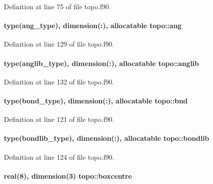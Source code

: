 Definition at line 75 of file topo.\-f90.

\hypertarget{classtopo_a56261b466e299c202f2e574284fbe9c4}{
\paragraph[{ang}]{\setlength{\rightskip}{0pt plus 5cm}type({\bf ang\-\_\-type}), dimension(\-:), allocatable topo\-::ang}}\label{classtopo_a56261b466e299c202f2e574284fbe9c4}


Definition at line 129 of file topo.\-f90.

\hypertarget{classtopo_a4eca44c180379aa76933b665a911feec}{
\paragraph[{anglib}]{\setlength{\rightskip}{0pt plus 5cm}type({\bf anglib\-\_\-type}), dimension(\-:), allocatable topo\-::anglib}}\label{classtopo_a4eca44c180379aa76933b665a911feec}


Definition at line 132 of file topo.\-f90.

\hypertarget{classtopo_ae81427ee7513e74fcb1520cdc0523e56}{
\paragraph[{bnd}]{\setlength{\rightskip}{0pt plus 5cm}type({\bf bond\-\_\-type}), dimension(\-:), allocatable topo\-::bnd}}\label{classtopo_ae81427ee7513e74fcb1520cdc0523e56}


Definition at line 121 of file topo.\-f90.

\hypertarget{classtopo_af8d6aa1609b783f42bbac18b0cf8ae54}{
\paragraph[{bondlib}]{\setlength{\rightskip}{0pt plus 5cm}type({\bf bondlib\-\_\-type}), dimension(\-:), allocatable topo\-::bondlib}}\label{classtopo_af8d6aa1609b783f42bbac18b0cf8ae54}


Definition at line 124 of file topo.\-f90.

\hypertarget{classtopo_a352c64cb90d5b00eea0402dc6954e595}{
\paragraph[{boxcentre}]{\setlength{\rightskip}{0pt plus 5cm}real(8), dimension(3) topo\-::boxcentre}}\label{classtopo_a352c64cb90d5b00eea0402dc6954e595}


